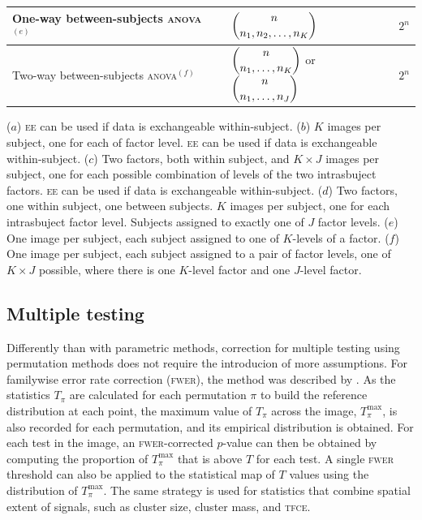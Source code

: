 \begin{table}[p]
\begin{center}
{\begin{tabular}{@{}l@{}m{57mm}<{\centering}@{}m{10mm}<{\centering}@{}}
\midrule
One-way between-subjects \textsc{anova}$^{(e)}$  & \vspace*{3mm}$\dbinom{n}{n_1,n_2,\ldots,n_K}$\vspace*{3mm} & $2^{n}$\\
\midrule
Two-way between-subjects \textsc{anova}$^{(f)}$  & \vspace*{3mm}$\dbinom{n}{n_1,\ldots,n_K}$ or $\dbinom{n}{n_1,\ldots,n_J}$\vspace*{3mm} & $2^{n}$ \\
\bottomrule
\end{tabular}}
\end{center}
{\footnotesize
($a$) \textsc{ee} can be used if data is exchangeable within-subject.
($b$) $K$ images per subject, one for each of factor level. \textsc{ee} can be used if data is exchangeable within-subject.
($c$) Two factors, both within subject, and $K \times J$ images per subject, one for each possible combination of levels of the two intrasbuject factors. \textsc{ee} can be used if data is exchangeable within-subject.
($d$) Two factors, one within subject, one between subjects. $K$ images per subject, one for each intrasbuject factor level. Subjects assigned to exactly one of $J$ factor levels.
($e$) One image per subject, each subject assigned to one of $K$-levels of a factor.
($f$) One image per subject, each subject assigned to a pair of factor levels, one of $K \times J$ possible, where there is one $K$-level factor and one $J$-level factor.}
\label{tab:taxonomy}
\end{table}

\subsection{Multiple testing}

Differently than with parametric methods, correction for multiple testing using permutation methods does not require the introducion of more assumptions. For familywise error rate correction (\textsc{fwer}), the method was described by \citet{Nichols2002}. As the statistics $T_{\pi}$ are calculated for each permutation $\pi$ to build the reference distribution at each point, the maximum value of $T_{\pi}$ across the image, $T_{\pi}^{\text{max}}$, is also recorded for each permutation, and its empirical distribution is obtained. For each test in the image, an \textsc{fwer}-corrected $p$-value can then be obtained by computing the proportion of $T_{\pi}^{\text{max}}$ that is above $T$ for each test. A single \textsc{fwer} threshold can also be applied to the statistical map of $T$ values using the distribution of $T_{\pi}^{\text{max}}$. The same strategy is used for statistics that combine spatial extent of signals, such as cluster size, cluster mass, and \textsc{tfce}.

